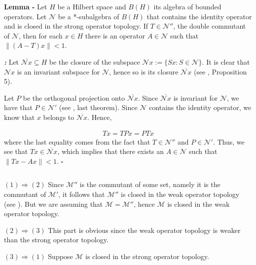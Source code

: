 \documentclass[12pt]{article}
\begin{document}

{\bf Lemma -} Let $H$ be a Hilbert space and $B(H)$ its algebra of bounded operators. Let $\mathcal{N}$ be a *-subalgebra of $B(H)$ that contains the identity operator and is closed in the strong operator topology. If $T \in \mathcal{N}''$, the double commutant of $\mathcal{N}$, then for each $x \in H$ there is an operator $A \in \mathcal{N}$ such that $\|(A-T)x\| < 1$.

{\bf \emph{:}} Let $\overline{\mathcal{N}x} \subseteq H$ be the closure of the subspace $\mathcal{N}x := \{Sx: S \in \mathcal{N}\}$. It is clear that $\mathcal{N}x$ is an invariant subspace for $\mathcal{N}$, hence so is its closure $\overline{\mathcal{N}x}$ (see , Proposition 5).

Let $P$ be the orthogonal projection onto $\overline{\mathcal{N}x}$. Since $\overline{\mathcal{N}x}$ is invariant for $\mathcal{N}$, we have that $P \in \mathcal{N}'$ (see , last theorem). Since $\mathcal{N}$ contains the identity operator, we know that $x$ belongs to $\overline{\mathcal{N}x}$. Hence,

\begin{align*}
Tx = TPx = PTx
\end{align*}
where the last equality comes from the fact that $T \in \mathcal{N}''$ and $P \in \mathcal{N}'$. Thus, we see that $Tx \in \overline{\mathcal{N}x}$, which implies that there exists an $A \in \mathcal{N}$ such that $\|Tx - Ax\| < 1$. $\square$

$\,$

{\bf {}} $(1) \Longrightarrow (2)$ Since $\mathcal{M}''$ is the commutant of some set, namely it is the commutant of $\mathcal{M}'$, it follows that $\mathcal{M}''$ is closed in the weak operator topology (see ). But we are assuming that $\mathcal{M} = \mathcal{M}''$, hence $\mathcal{M}$ is closed in the weak operator topology.

$(2) \Longrightarrow (3)$ This part is obvious since the weak operator topology is weaker than the strong operator topology.

$(3) \Longrightarrow (1)$ Suppose $\mathcal{M}$ is closed in the strong operator topology.
\end{document}
